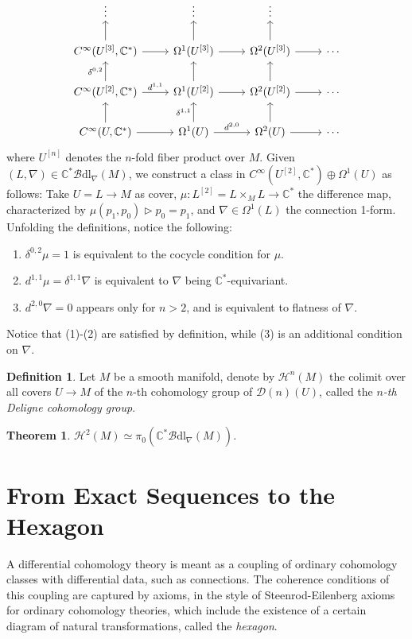 \documentclass[a4paper]{book}
\newcommand{\lB}{\mathcal{B}}
\newcommand{\bC}{\mathbb{C}}
\newcommand{\lD}{\mathcal{D}}
\newcommand{\lH}{\mathcal{H}}
\newcommand{\Bdl}{\lB\mathrm{dl}} %
\newtheorem{theorem}[equation]{Theorem}
\theoremstyle{definition}
\newtheorem{definition}[equation]{Definition}
\theoremstyle{remark}
\numberwithin{equation}{section}
\begin{document}
\begin{equation}\label{eq:bicomp}
	\begin{tikzcd}
		\vdots & \vdots & \vdots   \\
		C^\infty(U^{[3]},\bC^*) \arrow[r]\arrow[u] & \Omega^1(U^{[3]}) \arrow[r]\arrow[u] &  \Omega^2(U^{[3]}) \arrow[u] \arrow[r] & \cdots \\ 
		C^\infty(U^{[2]},\bC^*) \arrow[r," d^{1,1}"]\arrow[u,"\delta^{0,2}"] & \Omega^1(U^{[2]}) \arrow[u]\arrow[r] & \Omega^2(U^{[2]}) \arrow[u]\arrow[r] & \cdots\\
		C^\infty(U,\bC^*) \arrow[r]\arrow[u] & \Omega^1(U) \arrow[r," d^{2,0}"]\arrow[u,"\delta^{1,1}"] & \Omega^2(U) \arrow[u] \arrow[r] & \cdots
	\end{tikzcd}
\end{equation}where $U^{[n]}$ denotes the $n$-fold fiber product over $M$. Given $(L,\nabla)\in\bC^*\Bdl_\nabla(M)$, we construct a class in $C^\infty(U^{[2]},\bC^*)\oplus\Omega^1(U)$ as follows: Take $U=L\to M$ as cover, $\mu:L^{[2]}=L\times_ML\to\bC^*$ the difference map, characterized by $\mu(p_1,p_0)\triangleright p_0=p_1$, and $\nabla\in\Omega^1(L)$ the connection 1-form. Unfolding the definitions, notice the following:
\begin{enumerate}
	\item $\delta^{0,2}\mu=1$ is equivalent to the cocycle condition for $\mu$.
	\item $ d^{1,1}\mu=\delta^{1,1}\nabla$ is equivalent to $\nabla$ being $\bC^*$-equivariant.
	\item $ d^{2,0}\nabla=0$ appears only for $n>2$, and is equivalent to flatness of $\nabla$.  
\end{enumerate}
Notice that (1)-(2) are satisfied by definition, while (3) is an additional condition on $\nabla$.
\begin{definition}
	Let $M$ be a smooth manifold, denote by $\lH^n(M)$ the colimit over all covers $U\to M$ of the $n$-th cohomology group of $\lD(n)(U)$, called the \emph{$n$-th Deligne cohomology group}. 
\end{definition}
\begin{theorem}
	$\lH^2(M)\simeq\pi_0(\bC^*\Bdl_\nabla(M))$.
\end{theorem} 

\section{From Exact Sequences to the Hexagon}
A differential cohomology theory is meant as a coupling of ordinary cohomology classes with differential data, such as connections. The coherence conditions of this coupling are captured by axioms, in the style of Steenrod-Eilenberg axioms for ordinary cohomology theories, which include the existence of a certain diagram of natural transformations, called the \emph{hexagon}.
\end{document}
